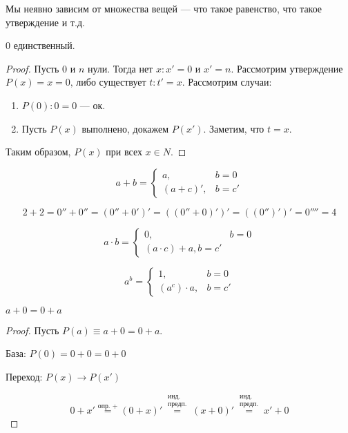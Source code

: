 \begin{remark}
    Мы неявно зависим от множества вещей --- что такое равенство, что такое утверждение и т.д.
\end{remark}

\begin{statement}
    \(0\) единственный.
\end{statement}
\begin{proof}
    Пусть \(0\) и \(n\) нули. Тогда нет \(x : x' = 0\) и \(x' = n\). Рассмотрим утверждение \(P(x) = x = 0 \text{, либо существует } t: t' = x\). Рассмотрим случаи:
    \begin{enumerate}
        \item \(P(0) : 0 = 0\) --- ок.
        \item Пусть \(P(x)\) выполнено, докажем \(P(x')\). Заметим, что \(t = x\).
    \end{enumerate}

    Таким образом, \(P(x)\) при всех \(x \in N\).
\end{proof}

\begin{definition}
    \[a + b = \begin{cases}
            a,        & b = 0  \\
            (a + c)', & b = c'
        \end{cases} \]
\end{definition}

\begin{example}
    \[2 + 2 = 0'' + 0'' = (0'' + 0')' = ((0'' + 0)')' = ((0'')')' = 0'''' = 4\]
\end{example}

\begin{definition}
    \[a \cdot b = \begin{cases}
            0, & b = 0 \\
            (a \cdot c) + a, b = c'
        \end{cases} \]

    \[a^b = \begin{cases} 1, & b = 0 \\ (a^c) \cdot a, & b = c' \end{cases} \]
\end{definition}

\begin{statement}
    \label{a+0}
    \(a + 0 = 0 + a\)
\end{statement}
\begin{proof}
    Пусть \(P(a) \equiv a + 0 = 0 + a\).

    База: \(P(0) = 0 + 0 = 0 + 0\)

    Переход: \(P(x) \to P(x')\)

    \[0 + x' \stackrel{\text{опр. }+}{=} (0 + x)' \stackrel{\substack{\text{инд.}\\\text{предп.}}}{=} (x + 0)' \stackrel{\substack{\text{инд.}\\\text{предп.}}}{=} x' + 0\]
\end{proof}

